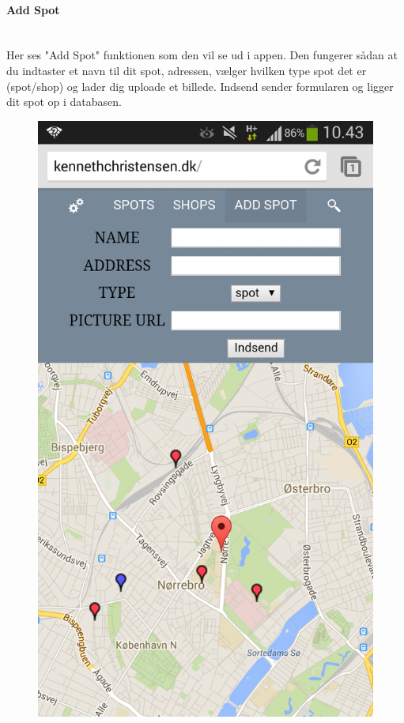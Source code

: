 \documentclass[12pt]{article}
\begin{document}
\newpage
\paragraph{Add Spot}\mbox{}\\
Her ses "Add Spot" funktionen som den vil se ud i appen. Den fungerer sådan at du indtaster et navn til dit spot, adressen, vælger hvilken type spot det er (spot/shop) og lader dig uploade et billede. Indsend sender formularen og ligger dit spot op i databasen.\\
\begin{figure}[h]
\includegraphics[scale = 0.3]{addspotscreen}
\end{figure}
\end{document}
